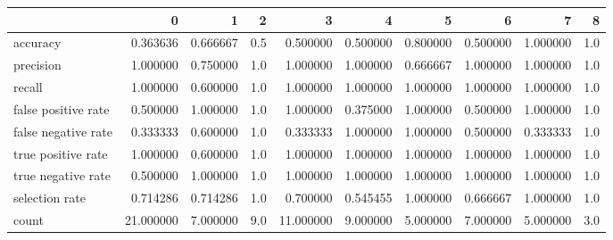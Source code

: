 \begin{tabular}{lrrrrrrrrr}
\toprule
{} &          0 &         1 &    2 &          3 &         4 &         5 &         6 &         7 &    8 \\
\midrule
accuracy            &   0.363636 &  0.666667 &  0.5 &   0.500000 &  0.500000 &  0.800000 &  0.500000 &  1.000000 &  1.0 \\
precision           &   1.000000 &  0.750000 &  1.0 &   1.000000 &  1.000000 &  0.666667 &  1.000000 &  1.000000 &  1.0 \\
recall              &   1.000000 &  0.600000 &  1.0 &   1.000000 &  1.000000 &  1.000000 &  1.000000 &  1.000000 &  1.0 \\
false positive rate &   0.500000 &  1.000000 &  1.0 &   1.000000 &  0.375000 &  1.000000 &  0.500000 &  1.000000 &  1.0 \\
false negative rate &   0.333333 &  0.600000 &  1.0 &   0.333333 &  1.000000 &  1.000000 &  0.500000 &  0.333333 &  1.0 \\
true positive rate  &   1.000000 &  0.600000 &  1.0 &   1.000000 &  1.000000 &  1.000000 &  1.000000 &  1.000000 &  1.0 \\
true negative rate  &   0.500000 &  1.000000 &  1.0 &   1.000000 &  1.000000 &  1.000000 &  1.000000 &  1.000000 &  1.0 \\
selection rate      &   0.714286 &  0.714286 &  1.0 &   0.700000 &  0.545455 &  1.000000 &  0.666667 &  1.000000 &  1.0 \\
count               &  21.000000 &  7.000000 &  9.0 &  11.000000 &  9.000000 &  5.000000 &  7.000000 &  5.000000 &  3.0 \\
\bottomrule
\end{tabular}

